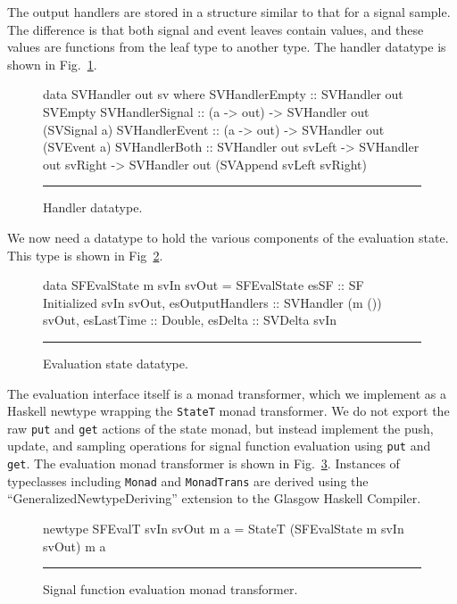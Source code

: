 \documentclass[draft]{llncs}
\begin{document}
The output handlers are stored in a structure similar to that for a signal
sample. The difference is that both signal and event leaves contain values, and
these values are functions from the leaf type to another type. The handler
datatype is shown in Fig.~\ref{figure:handler_datatype}.

\begin{figure}[t]
\begin{code}
data SVHandler out sv where
  SVHandlerEmpty  :: SVHandler out SVEmpty
  SVHandlerSignal :: (a -> out) -> SVHandler out (SVSignal a)
  SVHandlerEvent  :: (a -> out) -> SVHandler out (SVEvent a)
  SVHandlerBoth   :: SVHandler out svLeft -> SVHandler out svRight 
                     -> SVHandler out (SVAppend svLeft svRight)
\end{code}
\hrule
\caption{Handler datatype.}
\label{figure:handler_datatype}
\end{figure}

We now need a datatype to hold the various components of the evaluation state.
This type is shown in Fig~\ref{figure:evaluation_state_datatype}.

\begin{figure}[t]
\begin{code}
data SFEvalState m svIn svOut 
  = SFEvalState { 
                  esSF :: SF Initialized svIn svOut,
                  esOutputHandlers :: SVHandler (m ()) svOut,
                  esLastTime :: Double,
                  esDelta :: SVDelta svIn
                }

\end{code}
\hrule
\caption{Evaluation state datatype.}
\label{figure:evaluation_state_datatype}
\end{figure}

The evaluation interface itself is a monad transformer, which we implement
as a Haskell newtype wrapping the {\tt StateT} monad transformer. We do not
export the raw {\tt put} and {\tt get} actions of the state monad, but instead
implement the push, update, and sampling operations for signal function
evaluation using {\tt put} and {\tt get}. The evaluation monad transformer is
shown in Fig.~\ref{figure:signal_function_evaluation_monad_transformer}.
Instances of typeclasses including {\tt Monad} and {\tt MonadTrans} are derived
using the ``GeneralizedNewtypeDeriving'' extension to the Glasgow Haskell
Compiler.

\begin{figure}[t]
\begin{code}
newtype SFEvalT svIn svOut m a = StateT (SFEvalState m svIn svOut) m a
\end{code}
\hrule
\caption{Signal function evaluation monad transformer.}
\label{figure:signal_function_evaluation_monad_transformer}
\end{figure}
\end{document}
